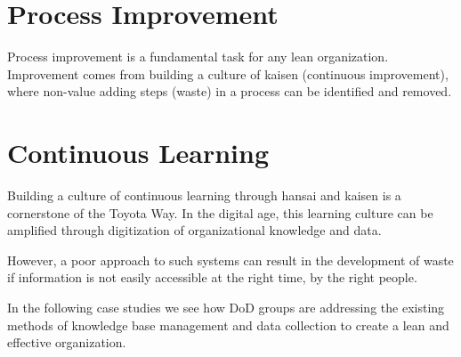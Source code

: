 \documentclass{article}
\begin{document}
	\section{Process Improvement}

		Process improvement is a fundamental task for any lean organization. 
		Improvement comes from building a culture of kaisen (continuous improvement), where non-value adding steps (waste) in a process can be identified and removed.



	\section{Continuous Learning}

		Building a culture of continuous learning through hansai and kaisen is a cornerstone of the Toyota Way.
		In the digital age, this learning culture can be amplified through digitization of organizational knowledge and data.

		However, a poor approach to such systems can result in the development of waste if information is not easily accessible at the right time, by the right people.

		In the following case studies we see how DoD groups are addressing the existing methods of knowledge base management and data collection to create a lean and effective organization.



\newpage


\nocite{*}

\end{document}
